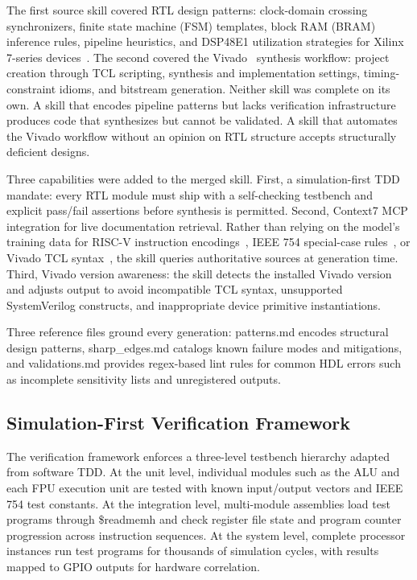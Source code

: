 \documentclass[journal]{IEEEtran}
\begin{document}
The first source skill covered RTL design patterns: clock-domain crossing synchronizers, finite state machine (FSM) templates, block RAM (BRAM) inference rules, pipeline heuristics, and DSP48E1 utilization strategies for Xilinx 7-series devices~\cite{xilinx2020ds180}. The second covered the Vivado~\cite{xilinx2020ug901} synthesis workflow: project creation through TCL scripting, synthesis and implementation settings, timing-constraint idioms, and bitstream generation. Neither skill was complete on its own. A skill that encodes pipeline patterns but lacks verification infrastructure produces code that synthesizes but cannot be validated. A skill that automates the Vivado workflow without an opinion on RTL structure accepts structurally deficient designs.

Three capabilities were added to the merged skill. First, a simulation-first TDD mandate: every RTL module must ship with a self-checking testbench and explicit pass/fail assertions before synthesis is permitted. Second, Context7 MCP integration for live documentation retrieval. Rather than relying on the model's training data for RISC-V instruction encodings~\cite{waterman2019riscv}, IEEE 754 special-case rules~\cite{ieee754_2019}, or Vivado TCL syntax~\cite{xilinx2020ug901}, the skill queries authoritative sources at generation time. Third, Vivado version awareness: the skill detects the installed Vivado version and adjusts output to avoid incompatible TCL syntax, unsupported SystemVerilog constructs, and inappropriate device primitive instantiations.

Three reference files ground every generation: patterns.md encodes structural design patterns, sharp\_edges.md catalogs known failure modes and mitigations, and validations.md provides regex-based lint rules for common HDL errors such as incomplete sensitivity lists and unregistered outputs.

\subsection{Simulation-First Verification Framework}

The verification framework enforces a three-level testbench hierarchy adapted from software TDD. At the unit level, individual modules such as the ALU and each FPU execution unit are tested with known input/output vectors and IEEE 754 test constants. At the integration level, multi-module assemblies load test programs through \$readmemh and check register file state and program counter progression across instruction sequences. At the system level, complete processor instances run test programs for thousands of simulation cycles, with results mapped to GPIO outputs for hardware correlation.
\end{document}
